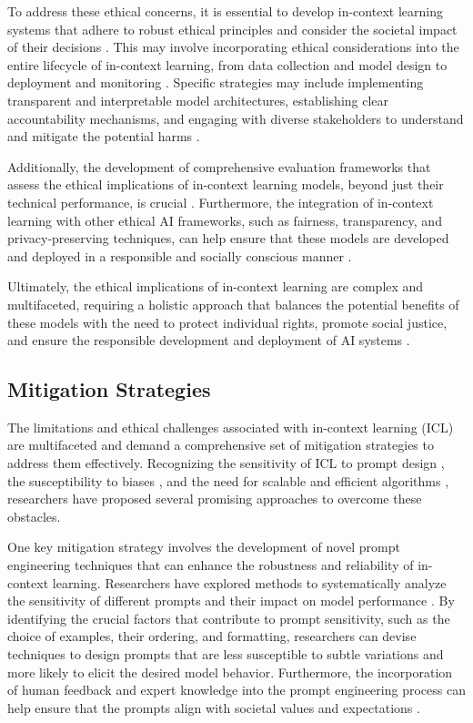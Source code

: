 \documentclass[11pt]{article}
\begin{document}
To address these ethical concerns, it is essential to develop in-context learning systems that adhere to robust ethical principles and consider the societal impact of their decisions \cite{ref343}. This may involve incorporating ethical considerations into the entire lifecycle of in-context learning, from data collection and model design to deployment and monitoring \cite{ref344}. Specific strategies may include implementing transparent and interpretable model architectures, establishing clear accountability mechanisms, and engaging with diverse stakeholders to understand and mitigate the potential harms \cite{ref345}.

Additionally, the development of comprehensive evaluation frameworks that assess the ethical implications of in-context learning models, beyond just their technical performance, is crucial \cite{ref346}. Furthermore, the integration of in-context learning with other ethical AI frameworks, such as fairness, transparency, and privacy-preserving techniques, can help ensure that these models are developed and deployed in a responsible and socially conscious manner \cite{ref347}.

Ultimately, the ethical implications of in-context learning are complex and multifaceted, requiring a holistic approach that balances the potential benefits of these models with the need to protect individual rights, promote social justice, and ensure the responsible development and deployment of AI systems \cite{ref348}.

\subsection{Mitigation Strategies}

The limitations and ethical challenges associated with in-context learning (ICL) are multifaceted and demand a comprehensive set of mitigation strategies to address them effectively. Recognizing the sensitivity of ICL to prompt design \cite{ref51}, the susceptibility to biases \cite{ref349}, and the need for scalable and efficient algorithms \cite{ref350}, researchers have proposed several promising approaches to overcome these obstacles.

One key mitigation strategy involves the development of novel prompt engineering techniques that can enhance the robustness and reliability of in-context learning. Researchers have explored methods to systematically analyze the sensitivity of different prompts and their impact on model performance \cite{ref51}. By identifying the crucial factors that contribute to prompt sensitivity, such as the choice of examples, their ordering, and formatting, researchers can devise techniques to design prompts that are less susceptible to subtle variations and more likely to elicit the desired model behavior. Furthermore, the incorporation of human feedback and expert knowledge into the prompt engineering process can help ensure that the prompts align with societal values and expectations \cite{ref56}.
\end{document}
